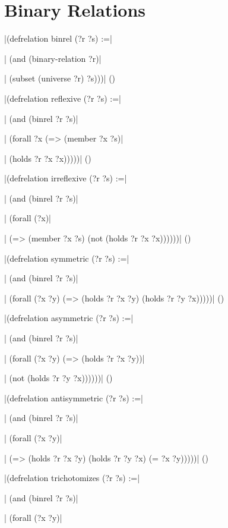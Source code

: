 \section{Binary Relations}

\verbatim|(defrelation binrel (?r ?s) :=|\par
\verbatim|  (and (binary-relation ?r)|\par
\verbatim|       (subset (universe ?r) ?s)))|
\hfill(\equation)\par
\bigskip
\verbatim|(defrelation reflexive (?r ?s) :=|\par
\verbatim|  (and (binrel ?r ?s)|\par
\verbatim|       (forall ?x (=> (member ?x ?s)|\par
\verbatim|                      (holds ?r ?x ?x)))))|
\hfill(\equation)\par
\bigskip
\verbatim|(defrelation irreflexive (?r ?s) :=|\par
\verbatim|  (and (binrel ?r ?s)|\par
\verbatim|       (forall (?x)|\par
\verbatim|               (=> (member ?x ?s) (not (holds ?r ?x ?x))))))|
\hfill(\equation)\par
\bigskip
\verbatim|(defrelation symmetric (?r ?s) :=|\par
\verbatim|  (and (binrel ?r ?s)|\par
\verbatim|       (forall (?x ?y) (=> (holds ?r ?x ?y) (holds ?r ?y ?x)))))|
\hfill(\equation)\par
\bigskip
\verbatim|(defrelation asymmetric (?r ?s) :=|\par
\verbatim|  (and (binrel ?r ?s)|\par
\verbatim|       (forall (?x ?y) (=> (holds ?r ?x ?y))|\par
\verbatim|                           (not (holds ?r ?y ?x))))))|
\hfill(\equation)\par
\bigskip
\verbatim|(defrelation antisymmetric (?r ?s) :=|\par
\verbatim|  (and (binrel ?r ?s)|\par
\verbatim|       (forall (?x ?y)|\par
\verbatim|         (=> (holds ?r ?x ?y) (holds ?r ?y ?x) (= ?x ?y)))))|
\hfill(\equation)\par
\bigskip
\verbatim|(defrelation trichotomizes (?r ?s) :=|\par
\verbatim|  (and (binrel ?r ?s)|\par
\verbatim|       (forall (?x ?y)|\par
